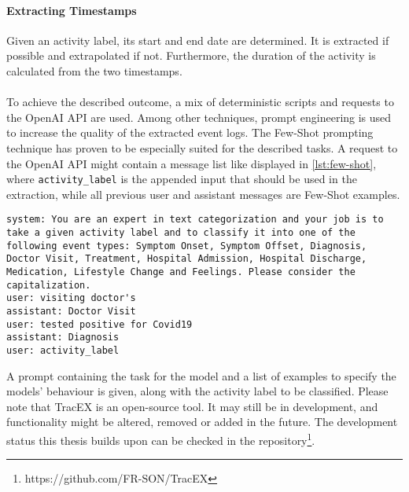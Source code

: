 \paragraph{Extracting Timestamps} Given an activity label, its start and end date are determined. It is extracted if possible and extrapolated if not. Furthermore, the duration of the activity is calculated from the two timestamps.\\\\
To achieve the described outcome, a mix of deterministic scripts and requests to the OpenAI API are used. Among other techniques, prompt engineering is used to increase the quality of the extracted event logs.
The Few-Shot prompting technique has proven to be especially suited for the described tasks. A request to the OpenAI API might contain a message list like displayed in \autoref{lst:few-shot}, where \verb|activity_label| is the appended input that should be used in the extraction, while all previous user and assistant messages are Few-Shot examples.
\begin{lstlisting}[language=prompt, caption={Few-shot prompt to categorize activities into event types}, label={lst:few-shot}]
system: You are an expert in text categorization and your job is to take a given activity label and to classify it into one of the following event types: Symptom Onset, Symptom Offset, Diagnosis, Doctor Visit, Treatment, Hospital Admission, Hospital Discharge, Medication, Lifestyle Change and Feelings. Please consider the capitalization.  
user: visiting doctor's 
assistant: Doctor Visit  
user: tested positive for Covid19
assistant: Diagnosis
user: activity_label  
\end{lstlisting}
A prompt containing the task for the model and a list of examples to specify the models' behaviour is given, along with the activity label to be classified.
Please note that TracEX is an open-source tool. It may still be in development, and functionality might be altered, removed or added in the future. The development status this thesis builds upon can be checked in the repository\footnote{https://github.com/FR-SON/TracEX}.
